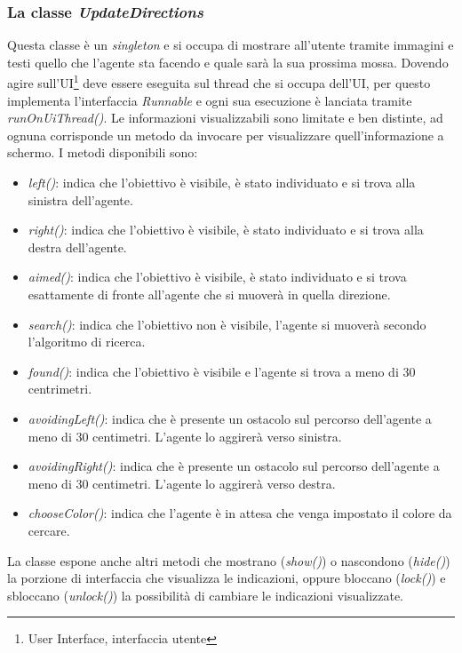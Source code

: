 \subsubsection{La classe \emph{UpdateDirections}}
Questa classe è un \emph{singleton} e si occupa di mostrare all'utente tramite 
immagini e testi quello che l'agente
sta facendo e quale sarà la sua prossima  mossa. Dovendo agire 
sull'UI\footnote{User Interface, interfaccia utente} deve essere eseguita sul thread
che si occupa dell'UI, per questo implementa l'interfaccia \emph{Runnable} e 
ogni sua esecuzione è lanciata  tramite \emph{runOnUiThread()}. 
Le informazioni visualizzabili sono limitate e ben distinte,
ad ognuna corrisponde un metodo da invocare per visualizzare quell'informazione
a schermo. I metodi disponibili sono: 
\begin{itemize}
	\item \emph{left()}: indica che l'obiettivo è visibile, è stato individuato e si trova alla sinistra dell'agente.
	\item \emph{right()}: indica che l'obiettivo è visibile, è stato individuato e si trova alla destra dell'agente.
	\item \emph{aimed()}: indica che l'obiettivo è visibile, è stato individuato e si trova esattamente di fronte all'agente che si muoverà in quella direzione.
	\item \emph{search()}: indica che l'obiettivo non è visibile, l'agente si muoverà secondo l'algoritmo di ricerca.
	\item \emph{found()}: indica che l'obiettivo è visibile e l'agente si trova a meno di 30 centrimetri.
	\item \emph{avoidingLeft()}: indica che è presente un ostacolo sul percorso dell'agente a meno di 30 centimetri. L'agente lo aggirerà verso sinistra. 
	\item \emph{avoidingRight()}: indica che è presente un ostacolo sul percorso dell'agente a meno di 30 centimetri. L'agente lo aggirerà verso destra.
	\item \emph{chooseColor()}: indica che l'agente è in attesa che venga impostato il colore da cercare. 
\end{itemize}
La classe espone anche altri metodi che mostrano (\emph{show()}) o nascondono 
(\emph{hide()}) la porzione di interfaccia che visualizza le indicazioni, oppure bloccano (\emph{lock()})
e sbloccano (\emph{unlock()}) la possibilità di cambiare le indicazioni visualizzate.

